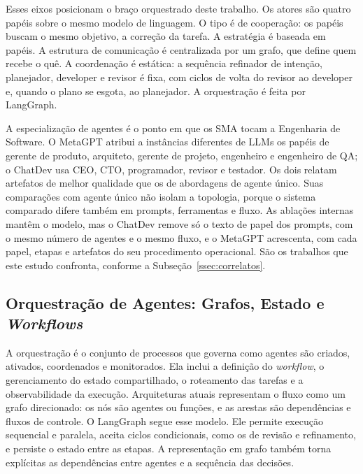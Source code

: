 Esses eixos posicionam o braço orquestrado deste trabalho. Os atores são quatro papéis sobre o mesmo modelo de linguagem. O tipo é de cooperação: os papéis buscam o mesmo objetivo, a correção da tarefa. A estratégia é baseada em papéis. A estrutura de comunicação é centralizada por um grafo, que define quem recebe o quê. A coordenação é estática: a sequência refinador de intenção, planejador, developer e revisor é fixa, com ciclos de volta do revisor ao developer e, quando o plano se esgota, ao planejador. A orquestração é feita por LangGraph.

A especialização de agentes é o ponto em que os SMA tocam a Engenharia de Software. O MetaGPT \citep{MetaGPT2023} atribui a instâncias diferentes de LLMs os papéis de gerente de produto, arquiteto, gerente de projeto, engenheiro e engenheiro de QA; o ChatDev \citep{ChatDev2023} usa CEO, CTO, programador, revisor e testador. Os dois relatam artefatos de melhor qualidade que os de abordagens de agente único. Suas comparações com agente único não isolam a topologia, porque o sistema comparado difere também em prompts, ferramentas e fluxo. As ablações internas mantêm o modelo, mas o ChatDev remove só o texto de papel dos prompts, com o mesmo número de agentes e o mesmo fluxo, e o MetaGPT acrescenta, com cada papel, etapas e artefatos do seu procedimento operacional. São os trabalhos que este estudo confronta, conforme a Subseção~\ref{ssec:correlatos}.

\subsection{Orquestração de Agentes: Grafos, Estado e \textit{Workflows}}
\label{ssec:orquestracao}

A orquestração é o conjunto de processos que governa como agentes são criados, ativados, coordenados e monitorados. Ela inclui a definição do \textit{workflow}, o gerenciamento do estado compartilhado, o roteamento das tarefas e a observabilidade da execução. Arquiteturas atuais representam o fluxo como um grafo direcionado: os nós são agentes ou funções, e as arestas são dependências e fluxos de controle. O LangGraph \citep{LangGraph2025} segue esse modelo. Ele permite execução sequencial e paralela, aceita ciclos condicionais, como os de revisão e refinamento, e persiste o estado entre as etapas. A representação em grafo também torna explícitas as dependências entre agentes e a sequência das decisões.

